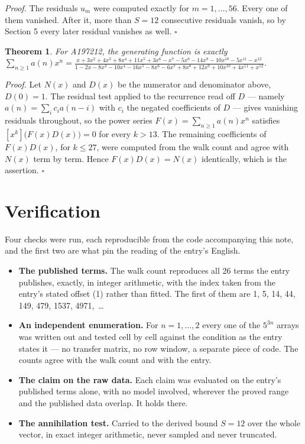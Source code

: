 \documentclass[11pt]{article}
\newtheorem{theorem}{Theorem}
\theoremstyle{definition}
\begin{document}
{\itshape Proof.} The residuals $u_m$ were computed exactly for $m = 1,\dots,56$. Every one of them vanished. After it, more than $S = 12$ consecutive residuals vanish, so by Section 5 every later residual vanishes as well. $\square$

\begin{theorem} For A197212, the generating function is exactly $\sum_{n\ge 1} a(n)x^n = \frac{x + 3x^{2} + 4x^{3} + 8x^{4} + 11x^{5} + 3x^{6} - x^{7} - 5x^{8} - 14x^{9} - 10x^{10} - 5x^{11} - x^{12}}{1 - 2x - 8x^{3} - 10x^{4} - 16x^{5} - 8x^{6} - 6x^{7} + 8x^{8} + 12x^{9} + 10x^{10} + 4x^{11} + x^{12}}$.\end{theorem}

{\itshape Proof.} Let $N(x)$ and $D(x)$ be the numerator and denominator above, $D(0)=1$. The residual test applied to the recurrence read off $D$ --- namely $a(n) = \sum_i c_i a(n-i)$ with $c_i$ the negated coefficients of $D$ --- gives vanishing residuals throughout, so the power series $F(x)=\sum_{n\ge 1}a(n)x^n$ satisfies $[x^k]\bigl(F(x)D(x)\bigr) = 0$ for every $k > 13$. The remaining coefficients of $F(x)D(x)$, for $k \le 27$, were computed from the walk count and agree with $N(x)$ term by term. Hence $F(x)D(x) = N(x)$ identically, which is the assertion. $\square$

\section{Verification}

Four checks were run, each reproducible from the code accompanying this note, and the first two are what pin the reading of the entry's English.

\begin{itemize}

\item {\bfseries The published terms.} The walk count reproduces all 26 terms the entry publishes, exactly, in integer arithmetic, with the index taken from the entry's stated offset (1) rather than fitted. The first of them are 1, 5, 14, 44, 149, 479, 1537, 4971,~\dots

\item {\bfseries An independent enumeration.} For $n = 1,\dots,2$ every one of the $5^{3n}$ arrays was written out and tested cell by cell against the condition as the entry states it --- no transfer matrix, no row window, a separate piece of code. The counts agree with the walk count and with the entry.

\item {\bfseries The claim on the raw data.} Each claim was evaluated on the entry's published terms alone, with no model involved, wherever the proved range and the published data overlap. It holds there.

\item {\bfseries The annihilation test.} Carried to the derived bound $S = 12$ over the whole vector, in exact integer arithmetic, never sampled and never truncated.

\end{itemize}
\end{document}
